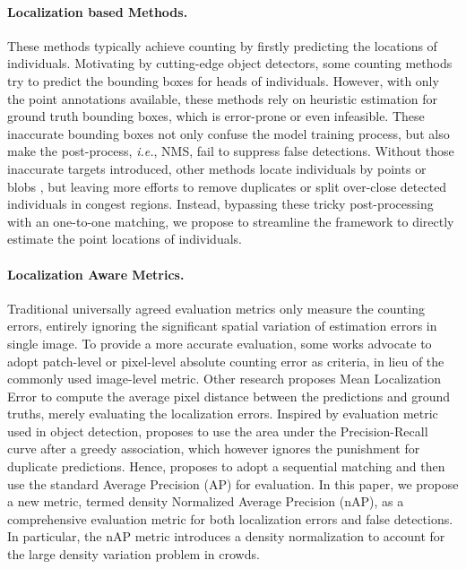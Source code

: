 \documentclass[10pt,twocolumn,letterpaper]{article}
\begin{document}
\paragraph{Localization based Methods.}These methods typically achieve counting by firstly predicting the locations of individuals. Motivating by cutting-edge object detectors, some counting methods \cite{lian2019density,liu2019point,sam2020locate} try to predict the bounding boxes for heads of individuals. However, with only the point annotations available, these methods rely on heuristic estimation for ground truth bounding boxes, which is error-prone or even infeasible. These inaccurate bounding boxes not only confuse the model training process, but also make the post-process, \textit{i.e.}, NMS, fail to suppress false detections. Without those inaccurate targets introduced, other methods locate individuals by points \cite{liu2019recurrent} or blobs \cite{laradji2018blobs}, but leaving more efforts to remove duplicates or split over-close detected individuals in congest regions. Instead, bypassing these tricky post-processing with an one-to-one matching, we propose to streamline the framework to directly estimate the point locations of individuals.
\vspace{-1.0em}
\paragraph{Localization Aware Metrics.}Traditional universally agreed evaluation metrics only measure the counting errors, entirely ignoring the significant spatial variation of estimation errors in single image. To provide a more accurate evaluation, some works \cite{guerrero2015extremely,liu2019geometric, tian2019padnet} advocate to adopt patch-level or pixel-level absolute counting error as criteria, in lieu of the commonly used image-level metric. Other research \cite{sam2020locate} proposes Mean Localization Error to compute the average pixel distance between the predictions and ground truths, merely evaluating the localization errors. Inspired by evaluation metric used in object detection, \cite{idrees2018composition} proposes to use the area under the Precision-Recall curve after a greedy association, which however ignores the punishment for duplicate predictions. Hence, \cite{liu2019recurrent} proposes to adopt a sequential matching and then use the standard Average Precision (AP) for evaluation. In this paper, we propose a new metric, termed density Normalized Average Precision (nAP), as a comprehensive evaluation metric for both localization errors and false detections. In particular, the nAP metric introduces a density normalization to account for the large density variation problem in crowds.
\end{document}
